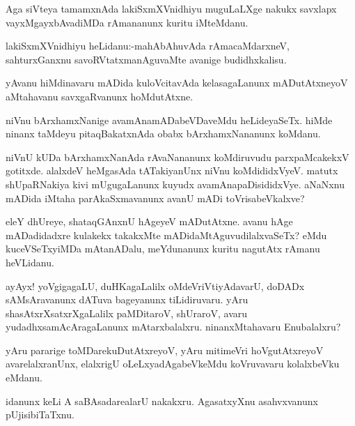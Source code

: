 \documentclass{article}
\begin{document}
\begin{mn}%
Aga siVteya tamamxnAda lakiSxmXVnidhiyu muguLaLXge nakukx savxlapx vayxMgayxbAvadiMDa 
rAmananunx kuritu iMteMdanu.
\end{mn}

\begin{mn}%
lakiSxmXVnidhiyu heLidanu:-mahAbAhuvAda rAmacaMdarxneV, sahturxGanxnu 
savoRVtatxmanAguvaMte avanige budidhxkalisu.
\end{mn}

\begin{mn}%
yAvanu hiMdinavaru mADida kuloVcitavAda kelasagaLanunx mADutAtxneyoV aMtahavanu 
savxgaRvanunx hoMdutAtxne.
\end{mn}

\begin{mn}%
niVnu bArxhamxNanige avamAnamADabeVDaveMdu heLideyaSeTx. hiMde ninanx taMdeyu 
pitaqBakatxnAda obabx bArxhamxNananunx koMdanu.
\end{mn}

\begin{mn}%
niVnU kUDa bArxhamxNanAda rAvaNananunx koMdiruvudu parxpaMcakekxV gotitxde. alalxdeV 
heMgasAda tATakiyanUnx niVnu koMdididxVyeV. matutx shUpaRNakiya kivi mUgugaLanunx kuyudx 
avamAnapaDisididxVye. aNaNxnu mADida iMtaha parAkaSxmavanunx avanU mADi toVrisabeVkalxve?
\end{mn}

\begin{mn}%
eleY dhUreye, shataqGAnxnU hAgeyeV mADutAtxne. avanu hAge mADadidadxre kulakekx takakxMte 
mADidaMtAguvudilalxvaSeTx? eMdu kuceVSeTxyiMDa mAtanADalu, meYdunanunx kuritu nagutAtx rAmanu
heVLidanu.
\end{mn}

\begin{mn}%
ayAyx! yoVgigagaLU, duHKagaLalilx oMdeVriVtiyAdavarU, doDADx sAMsAravanunx dATuva 
bageyanunx tiLidiruvaru. yAru shasAtxrXsatxrXgaLalilx paMDitaroV, shUraroV, avaru 
yudadhxsamAcAragaLanunx mAtarxbalalxru. ninanxMtahavaru Enubalalxru?
\end{mn}

\begin{mn}%
yAru pararige toMDarekuDutAtxreyoV, yAru mitimeVri hoVgutAtxreyoV avarelalxranUnx, 
elalxrigU oLeLxyadAgabeVkeMdu koVruvavaru kolalxbeVku eMdanu.
\end{mn}

\begin{mn}%
idanunx keLi A saBAsadarealarU nakakxru. AgasatxyXnu asahvxvanunx pUjisibiTaTxnu.
\end{mn}
\end{document}
